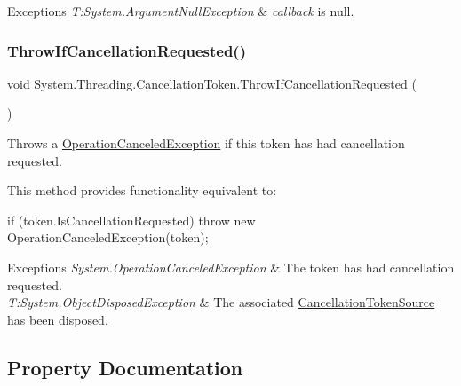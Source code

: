 \begin{DoxyExceptions}{Exceptions}
{\em T\+:\+System.\+Argument\+Null\+Exception} & {\itshape callback}  is null.\\
\hline
\end{DoxyExceptions}
\mbox{\label{struct_system_1_1_threading_1_1_cancellation_token_ab98969cae74910bdbdde565b167c5499}} 
\subsubsection{\texorpdfstring{Throw\+If\+Cancellation\+Requested()}{ThrowIfCancellationRequested()}}
{\footnotesize\ttfamily void System.\+Threading.\+Cancellation\+Token.\+Throw\+If\+Cancellation\+Requested (\begin{DoxyParamCaption}{ }\end{DoxyParamCaption})\hspace{0.3cm}{\ttfamily [inline]}}



Throws a \hyperlink{}{Operation\+Canceled\+Exception} if this token has had cancellation requested. 

This method provides functionality equivalent to\+: 
\begin{DoxyCode}
\textcolor{keywordflow}{if} (token.IsCancellationRequested)
   \textcolor{keywordflow}{throw} \textcolor{keyword}{new} OperationCanceledException(token);
\end{DoxyCode}
 


\begin{DoxyExceptions}{Exceptions}
{\em System.\+Operation\+Canceled\+Exception} & The token has had cancellation requested.\\
\hline
{\em T\+:\+System.\+Object\+Disposed\+Exception} & The associated \hyperlink{}{Cancellation\+Token\+Source} has been disposed.\\
\hline
\end{DoxyExceptions}


\subsection{Property Documentation}
\mbox{\label{struct_system_1_1_threading_1_1_cancellation_token_ae9726dbc54733ce5d174707fc596b8e9}} 
